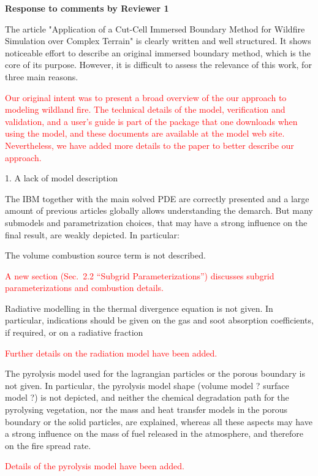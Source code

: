 \documentclass[12pt]{article}
\newcommand\hl[1]{\textcolor{red}{#1}}
\begin{document}
\begin{center}
{\bf Response to comments by Reviewer 1}
\end{center}

The article "Application of a Cut-Cell Immersed Boundary Method for Wildfire Simulation over
Complex Terrain" is clearly written and well structured. It shows noticeable effort to describe an
original immersed boundary method, which is the core of its purpose. However, it is difficult to
assess the relevance of this work, for three main reasons.

\hl{Our original intent was to present a broad overview of the our approach to modeling wildland fire. The technical details of the model, verification and validation, and a user's guide is part of the package that one downloads when using the model, and these documents are available at the model web site. Nevertheless, we have added more details to the paper to better describe our approach.}

1. A lack of model description

The IBM together with the main solved PDE are correctly presented and a large amount of
previous articles globally allows understanding the demarch. But many submodels and
parametrization choices, that may have a strong influence on the final result, are weakly
depicted. In particular:

The volume combustion source term is not described.

\hl{A new section (Sec.~2.2 ``Subgrid Parameterizations'') discusses subgrid parameterizations and combustion details.}

Radiative modelling in the thermal divergence equation is not given. In particular, indications
should be given on the gas and soot absorption coefficients, if required, or on a radiative fraction

\hl{Further details on the radiation model have been added.}

The pyrolysis model used for the lagrangian particles or the porous boundary is not given. In
particular, the pyrolysis model shape (volume model ? surface model ?) is not depicted, and
neither the chemical degradation path for the pyrolysing vegetation, nor the mass and heat
transfer models in the porous boundary or the solid particles, are explained, whereas all these
aspects may have a strong influence on the mass of fuel released in the atmosphere, and therefore
on the fire spread rate.

\hl{Details of the pyrolysis model have been added.}
\end{document}
